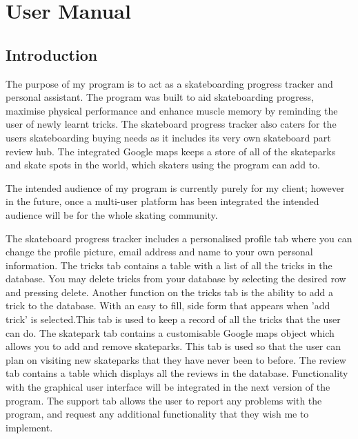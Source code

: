\chapter{User Manual}


\startcontents[chapters]


\section{Introduction}

The purpose of my program is to act as a skateboarding progress tracker and personal assistant. The program was built to aid skateboarding progress, maximise physical performance and enhance muscle memory by reminding the user of newly learnt tricks. The skateboard progress tracker also caters for the users skateboarding buying needs as it includes its very own skateboard part review hub. The integrated Google maps keeps a store of all of the skateparks and skate spots in the world, which skaters using the program can add to.

The intended audience of my program is currently purely for my client; however in the future, once a multi-user platform has been integrated the intended audience will be for the whole skating community.

The skateboard progress tracker includes a personalised profile tab where you can change the profile picture, email address and name to your own personal information. The tricks tab contains a table with a list of all the tricks in the database. You may delete tricks from your database by selecting the desired row and pressing delete. Another function on the tricks tab is the ability to add a trick to the database. With an easy to fill, side form that appears when 'add trick' is selected.This tab is used to keep a record of all the tricks that the user can do. The skatepark tab contains a customisable Google maps object which allows you to add and remove skateparks. This tab is used so that the user can plan on visiting new skateparks that they have never been to before. The review tab contains a table which displays all the reviews in the database. Functionality with the graphical user interface will be integrated in the next version of the program. The support tab allows the user to report any problems with the program, and request any additional functionality that they wish me to implement.





